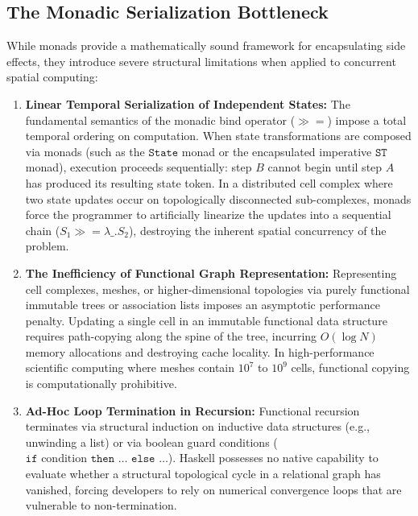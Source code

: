 \subsection{The Monadic Serialization Bottleneck}
While monads provide a mathematically sound framework for encapsulating side effects, they introduce severe structural limitations when applied to concurrent spatial computing:

\begin{enumerate}[leftmargin=1.2cm]
    \item \textbf{Linear Temporal Serialization of Independent States:}  
    The fundamental semantics of the monadic bind operator ($\gg=$) impose a total temporal ordering on computation. When state transformations are composed via monads (such as the $\texttt{State}$ monad or the encapsulated imperative $\texttt{ST}$ monad), execution proceeds sequentially: step $B$ cannot begin until step $A$ has produced its resulting state token. In a distributed cell complex where two state updates occur on topologically disconnected sub-complexes, monads force the programmer to artificially linearize the updates into a sequential chain ($S_1 \gg= \lambda \_. S_2$), destroying the inherent spatial concurrency of the problem.

    \item \textbf{The Inefficiency of Functional Graph Representation:}  
    Representing cell complexes, meshes, or higher-dimensional topologies via purely functional immutable trees or association lists imposes an asymptotic performance penalty. Updating a single cell in an immutable functional data structure requires path-copying along the spine of the tree, incurring $O(\log N)$ memory allocations and destroying cache locality. In high-performance scientific computing where meshes contain $10^7$ to $10^9$ cells, functional copying is computationally prohibitive.

    \item \textbf{Ad-Hoc Loop Termination in Recursion:}  
    Functional recursion terminates via structural induction on inductive data structures (e.g., unwinding a list) or via boolean guard conditions ($\texttt{if } \text{condition} \texttt{ then } \dots \texttt{ else } \dots$). Haskell possesses no native capability to evaluate whether a structural topological cycle in a relational graph has vanished, forcing developers to rely on numerical convergence loops that are vulnerable to non-termination.
\end{enumerate}

